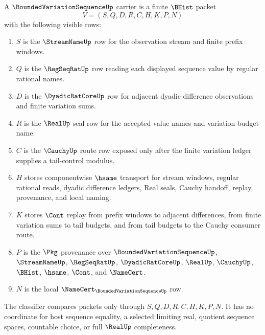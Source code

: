 \begin{definition}
\label{def:bounded-variation-sequence-carrier}
A $\BoundedVariationSequenceUp$ carrier is a finite $\BHist$ packet
$$
V=(S,Q,D,R,C,H,K,P,N)
$$
with the following visible rows:
\begin{enumerate}
\item $S$ is the $\StreamNameUp$ row for the observation stream and finite prefix windows.
\item $Q$ is the $\RegSeqRatUp$ row reading each displayed sequence value by regular rational names.
\item $D$ is the $\DyadicRatCoreUp$ row for adjacent dyadic difference observations and finite variation sums.
\item $R$ is the $\RealUp$ seal row for the accepted value names and variation-budget name.
\item $C$ is the $\CauchyUp$ route row exposed only after the finite variation ledger supplies a tail-control modulus.
\item $H$ stores componentwise $\hsame$ transport for stream windows, regular rational reads, dyadic difference ledgers, Real seals, Cauchy handoff, replay, provenance, and local naming.
\item $K$ stores $\Cont$ replay from prefix windows to adjacent differences, from finite variation sums to tail budgets, and from tail budgets to the Cauchy consumer route.
\item $P$ is the $\Pkg$ provenance over $\BoundedVariationSequenceUp$, $\StreamNameUp$, $\RegSeqRatUp$, $\DyadicRatCoreUp$, $\RealUp$, $\CauchyUp$, $\BHist$, $\hsame$, $\Cont$, and $\NameCert$.
\item $N$ is the local $\NameCert_{\BoundedVariationSequenceUp}$ row.
\end{enumerate}
The classifier compares packets only through $S,Q,D,R,C,H,K,P,N$. It has no coordinate for host sequence equality, a selected limiting real, quotient sequence spaces, countable choice, or full $\RealUp$ completeness.
\end{definition}

